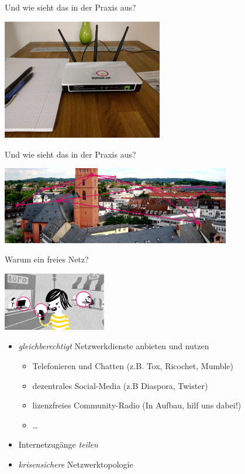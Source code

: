 \documentclass[10pt]{beamer}
\begin{document}
    \begin{frame}{Und wie sieht das in der Praxis aus?}
      \begin{center}
        \includegraphics[width=7cm]{images/homerouter}
      \end{center}
    \end{frame}

    \begin{frame}{Und wie sieht das in der Praxis aus?}
      \begin{center}
        \includegraphics[width=10cm]{images/banner-stadtkirche-darmstadt}
      \end{center}
    \end{frame}

    \begin{frame}{Warum ein freies Netz?}

      \begin{center}
        \includegraphics[width=4.5cm]{images/verbindet}
      \end{center}

      \begin{itemize}
        \item \emph{gleichberechtigt} Netzwerkdienste anbieten und nutzen
        \begin{itemize}
          \item Telefonieren und Chatten (z.B. Tox, Ricochet, Mumble)
          \item dezentrales Social-Media (z.B Diaspora, Twister)
          \item lizenzfreies Community-Radio (In Aufbau, hilf uns dabei!)
          \item \ldots
        \end{itemize}
        \item Internetzugänge \emph{teilen}
        \item \emph{krisensichere} Netzwerktopologie
      \end{itemize}
      \vfill
    \end{frame}
\end{document}
